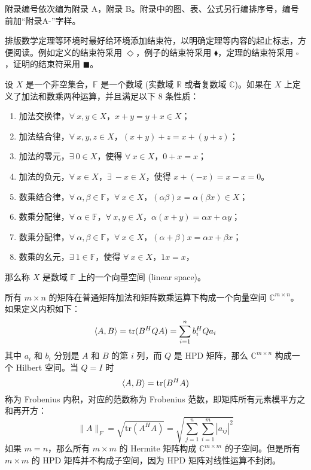 

附录编号依次编为附录 A，附录 B。附录中的图、表、公式另行编排序号，编号前加“附录A-”字样。

排版数学定理等环境时最好给环境添加结束符，以明确定理等内容的起止标志，方便阅读。例如定义的结束符采用 $\Diamond$，例子的结束符采用 $\blacklozenge$，定理的结束符采用 $\square$，证明的结束符采用 $\blacksquare$。

\begin{definition}[向量空间]
	设 $X$ 是一个非空集合，$\mathbb{F}$ 是一个数域 (实数域 $\mathbb{R}$ 或者复数域 $\mathbb{C}$)。如果在 $X$ 上定义了加法和数乘两种运算，并且满足以下 8 条性质：
	\begin{enumerate}
		\item 加法交换律，$\forall~x,y \in X$，$x+y = y+x \in X$；
		\item 加法结合律，$\forall~x,y,z \in X$，$(x+y)+z = x+(y+z)$；
		\item 加法的零元，$\exists~0 \in X$，使得 $\forall~x \in X$，$0+x = x$；
		\item 加法的负元，$\forall~x \in X$，$\exists~-x \in X$，使得 $x+(-x) = x-x = 0$。
		\item 数乘结合律，$\forall~\alpha,\beta \in \mathbb{F}$，$\forall~x \in X$，$(\alpha\beta)x = \alpha(\beta x) \in X$；
		\item 数乘分配律，$\forall~\alpha \in \mathbb{F}$，$\forall~x,y \in X$，$\alpha(x+y) = \alpha x + \alpha y$；
		\item 数乘分配律，$\forall~\alpha,\beta \in \mathbb{F}$，$\forall~x \in X$，$(\alpha+\beta)x = \alpha x + \beta x$；
		\item 数乘的幺元，$\exists~1 \in \mathbb{F}$，使得 $\forall~x \in X$，$1 x = x$，
	\end{enumerate}
	那么称 $X$ 是数域 $\mathbb{F}$ 上的一个{\hei 向量空间} (linear space)。
\end{definition}

\begin{example}[矩阵空间]
	所有 $m\times n$ 的矩阵在普通矩阵加法和矩阵数乘运算下构成一个向量空间 $\mathbb{C}^{m\times n}$。如果定义内积如下：
	\begin{equation}
	\langle A,B \rangle = \mathrm{tr}(B^H Q A) = \sum_{i=1}^{n} b_i^H Q a_i
	\end{equation}
	其中 $a_i$ 和 $b_i$ 分别是 $A$ 和 $B$ 的第 $i$ 列，而 $Q$ 是 HPD 矩阵，那么 $\mathbb{C}^{m\times n}$ 构成一个 Hilbert 空间。当 $Q=I$ 时
	\begin{equation}
	\langle A,B \rangle = \mathrm{tr}(B^H A)
	\end{equation}
	称为 Frobenius 内积，对应的范数称为 Frobenius 范数，即矩阵所有元素模平方之和再开方：
	\begin{equation} \label{equ_chap1_frob_norm}
	\|A\|_F = \sqrt{\mathrm{tr}(A^H A)} = \sqrt{\sum_{j=1}^{n}\sum_{i=1}^{m} |a_{ij}|^2}
	\end{equation}
	如果 $m=n$，那么所有 $m\times m$ 的 Hermite 矩阵构成 $\mathbb{C}^{m\times m}$ 的子空间。但是所有 $m\times m$ 的 HPD 矩阵并不构成子空间，因为 HPD 矩阵对线性运算不封闭。
\end{example}

